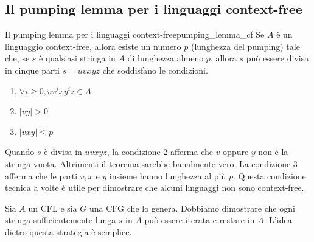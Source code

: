 \documentclass[12pt]{report}
\newcounter{theorem}
\newcounter{lemma}
\newcommand{\nmu}{}
\begin{document}
\subsection{Il pumping lemma per i linguaggi context-free}
\begin{theorem}{\nmu Il pumping lemma per i linguaggi context-free}{pumping_lemma_cf}
Se $A$ è un linguaggio context-free, allora esiste un numero $p$ (lunghezza del pumping) tale che, se $s$ è qualsiasi stringa in $A$ di lunghezza almeno $p$, allora $s$ può essere divisa in cinque parti $s = uvxyz$ che soddisfano le condizioni.
\begin{enumerate}
	\item $\forall i \geq 0, uv^ixy^iz \in A$
	\item $|vy| > 0$
	\item $|vxy| \leq p$
\end{enumerate}
Quando $s$ è divisa in $uvxyz$, la condizione 2 afferma che $v$ oppure $y$ non è la stringa vuota. Altrimenti il teorema sarebbe banalmente vero. La condizione 3 afferma che le parti $v, x$ e $y$ insieme hanno lunghezza al più $p$. Questa condizione tecnica a volte è utile per dimostrare che alcuni linguaggi non sono context-free.
\end{theorem}
Sia $A$ un CFL e sia $G$ una CFG che lo genera. Dobbiamo dimostrare che ogni stringa sufficientemente lunga $s$ in $A$ può essere iterata e restare in $A$. L'idea dietro questa strategia è semplice.
\end{document}
